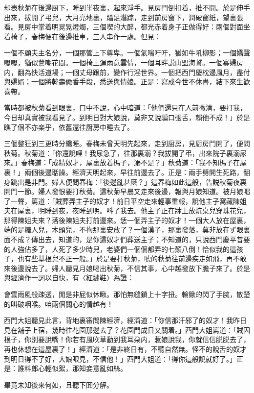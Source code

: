 却表秋菊在後邊厨下，睡到半夜裏，起來淨手。見房門倒扣着，推不開。於是伸手出來，拔開了弔兒，大月亮地裏，躡足潛踪，走到前房窗下，潤破窗紙，望裏張看。見房中掌着明晃晃燈燭，三個喫的大醉，都光赤着身子正做得好：兩個對面坐着椅子，春梅便在後邊推車，三人串作一處。但見：

一個不顧夫主名分，一個那管上下尊卑。一個氣喘吁吁，猶如牛吼柳影；一個嬌聲嚦嚦，猶似鶯嘲花間。一個椅上逞雨意雲情，一個耳畔説山盟海誓。一個寡婦房内，翻為快活道場；一個丈母跟前，變作行淫世界。一個把西門慶枕邊風月，盡付與嬌婿；一個將韓壽偸香手段，悉送與情娘。正是：寫成今世不休書，結下來生歡喜帶。

當時都被秋菊看到眼裏，口中不說，心中暗道：「他們還只在人前撇清，要打我，今日却真實被我看見了。到明日對大娘說，莫非又說騙口張舌，賴他不成！」於是瞧了個不亦楽乎，依舊還往厨房中睡去了。

三個整狂到三更時分纔睡。春梅未曾天明先起來，走到厨房，見厨房門開了，便問秋菊。秋菊道：「你還說哩！我尿急了，往那裏溺？我拔開了弔，出來院子裏溺尿來。」春梅道：「成精奴才，屋裏放着榪子，溺不是？」秋菊道：「我不知榪子在屋裏！」兩個後邊聒譟。經濟天明起來，早往前邊去了。正是：兩手劈開生死路，翻身跳出是非門。婦人便問春梅：「後邊亂甚麽？」這春梅如此這般，告説秋菊夜裏開門一節。婦人發恨要打秋菊。這秋菊早晨又走來後邊，報與月娘知道。被月娘喝了一聲，罵道：「賊葬弄主子的奴才！前日平空走來輕事重報，說他主子窝藏陳姐夫在屋裏，明睡到夜，夜睡到明。呌了我去。他主子正在牀上放炕桌兒穿珠花兒，那得陳姐夫來？落後陳姐夫打前邊來。恁一個弄主子的奴才！一個大人放在屋裏，端的是糖人兒，木頭兒，不拘那裏安放了？一個漢子，那裏發落，莫非放在ず眼裏面不成？傳出去，知道的，是你這奴才們葬送主子；不知道的，只說西門慶平昔要的人強佔多了，人死了多少時兒，老婆們一個個都弄的七顛八倒！恰似我的這孩子，也有些基根兒不正一般。」於是要打秋菊，唬的秋菊往前邊疾走如飛，再不敢來後邊說去了。婦人聽見月娘喝出秋菊，不信其事，心中越發放下膽子來了。於是與經濟作一詞以自快，有〈紅繡鞋〉為證：

會雲雨風般疎透，閒是非屁似休瞅。那怕無縫鎖上十字扭。輪鍬的閃了手腕，散楚的叫破咽喉。咱兩個關心的情越有！

西門大姐聽見此言，背地裏審問陳經濟，經濟道：「你信那汗邪了的奴才！我昨日見在舖子上宿，幾時往花園那邊去了？花園門成日又關着。」西門大姐罵道：「賊囚根子，你别要說嘴！你若有風吹草動到我耳朶内，惹娘說我，你就信信脱脱去了，再也休想在這屋裏了！」經濟道：「是非終日有，不聽自然無。怪不的說舌的奴才到明日得不了好，大娘眼見，不信他！」西門大姐道：「得你這般說就好了。」正是：誰料郎心輕似絮，那知妾意亂如絲。

畢竟未知後來何如，且聽下囬分解。


